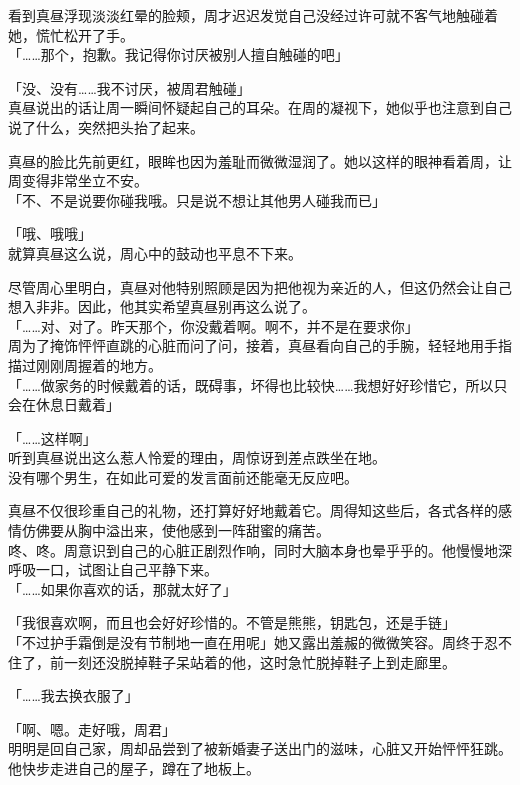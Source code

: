 看到真昼浮现淡淡红晕的脸颊，周才迟迟发觉自己没经过许可就不客气地触碰着她，慌忙松开了手。\\

「……那个，抱歉。我记得你讨厌被别人擅自触碰的吧」

「没、没有……我不讨厌，被周君触碰」\\

真昼说出的话让周一瞬间怀疑起自己的耳朵。在周的凝视下，她似乎也注意到自己说了什么，突然把头抬了起来。

真昼的脸比先前更红，眼眸也因为羞耻而微微湿润了。她以这样的眼神看着周，让周变得非常坐立不安。\\

「不、不是说要你碰我哦。只是说不想让其他男人碰我而已」

「哦、哦哦」\\

就算真昼这么说，周心中的鼓动也平息不下来。

尽管周心里明白，真昼对他特别照顾是因为把他视为亲近的人，但这仍然会让自己想入非非。因此，他其实希望真昼别再这么说了。\\

「……对、对了。昨天那个，你没戴着啊。啊不，并不是在要求你」\\

周为了掩饰怦怦直跳的心脏而问了问，接着，真昼看向自己的手腕，轻轻地用手指描过刚刚周握着的地方。\\

「……做家务的时候戴着的话，既碍事，坏得也比较快……我想好好珍惜它，所以只会在休息日戴着」

「……这样啊」\\

听到真昼说出这么惹人怜爱的理由，周惊讶到差点跌坐在地。\\

没有哪个男生，在如此可爱的发言面前还能毫无反应吧。

真昼不仅很珍重自己的礼物，还打算好好地戴着它。周得知这些后，各式各样的感情仿佛要从胸中溢出来，使他感到一阵甜蜜的痛苦。\\

咚、咚。周意识到自己的心脏正剧烈作响，同时大脑本身也晕乎乎的。他慢慢地深呼吸一口，试图让自己平静下来。\\

「……如果你喜欢的话，那就太好了」

「我很喜欢啊，而且也会好好珍惜的。不管是熊熊，钥匙包，还是手链」\\

「不过护手霜倒是没有节制地一直在用呢」她又露出羞赧的微微笑容。周终于忍不住了，前一刻还没脱掉鞋子呆站着的他，这时急忙脱掉鞋子上到走廊里。

「……我去换衣服了」

「啊、嗯。走好哦，周君」\\

明明是回自己家，周却品尝到了被新婚妻子送出门的滋味，心脏又开始怦怦狂跳。他快步走进自己的屋子，蹲在了地板上。
